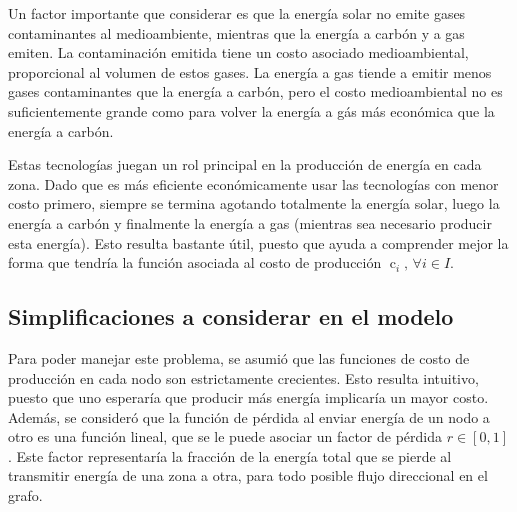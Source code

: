 \documentclass[12pt,twoside]{article}
\begin{document}
	\hspace{1cm} Un factor importante que considerar es que la energ\'ia solar no emite gases contaminantes al medioambiente, mientras que la energ\'ia a carb\'on y a gas emiten. La contaminaci\'on emitida tiene un costo asociado medioambiental, proporcional al volumen de estos gases. La energ\'ia a gas tiende a emitir menos gases contaminantes que la energ\'ia a carb\'on, pero el costo medioambiental no es suficientemente grande como para volver la energ\'ia a g\'as m\'as econ\'omica que la energ\'ia a carb\'on.
	
	\hspace{1cm} Estas tecnolog\'ias juegan un rol principal en la producci\'on de energ\'ia en cada zona. Dado que es m\'as eficiente econ\'omicamente usar las tecnolog\'ias con menor costo primero, siempre se termina agotando totalmente la energ\'ia solar, luego la energ\'ia a carb\'on y finalmente la energ\'ia a gas (mientras sea necesario producir esta energ\'ia). Esto resulta bastante \'util, puesto que ayuda a comprender mejor la forma que tendr\'ia la funci\'on asociada al costo de producci\'on \(\operatorname{c}_i,\,\forall i\in I\).
	
	\subsection{Simplificaciones a considerar en el modelo}
	\hspace{1cm} Para poder manejar este problema, se asumi\'o que las funciones de costo de producci\'on en cada nodo son estrictamente crecientes. Esto resulta intuitivo, puesto que uno esperar\'ia que producir m\'as energ\'ia implicar\'ia un mayor costo. Adem\'as, se consider\'o que la funci\'on de p\'erdida al enviar energ\'ia de un nodo a otro es una funci\'on lineal, que se le puede asociar un factor de p\'erdida \(r\in[0,1]\). Este factor representar\'ia la fracci\'on de la energ\'ia total que se pierde al transmitir energ\'ia de una zona a otra, para todo posible flujo direccional en el grafo.
	
\end{document}
